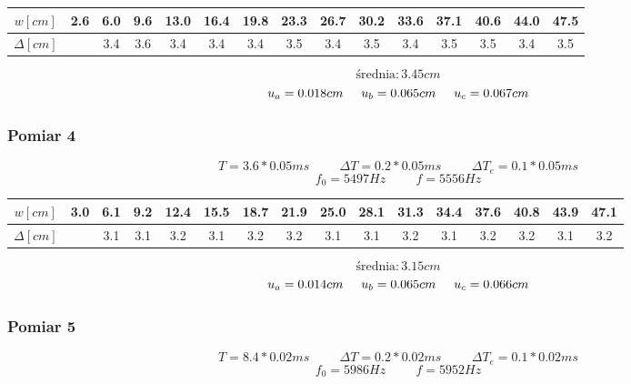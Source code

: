 \documentclass[12pt,a4paper]{article}
\begin{document}
\begin{adjustbox}{max width=1.2\textwidth}
\begin{tabular}{|c|cccccccccccccc|}
\hline 
$w[cm]$ & 2.6 & 6.0 & 9.6 &13.0& 16.4& 19.8 &23.3& 26.7 &30.2& 33.6 &37.1 &40.6& 44.0& 47.5 \\ 
\hline 
$\Delta[cm]$ & & 3.4 &3.6& 3.4& 3.4 &3.4 &3.5& 3.4 &3.5& 3.4& 3.5& 3.5& 3.4& 3.5 \\ 
\hline 
\end{tabular} 
\end{adjustbox}


$$\text{średnia}: 3.45cm$$
$$u_a = 0.018cm \hspace{0.5cm} u_b = 0.065cm \hspace{0.5cm} u_c = 0.067cm $$

\subsubsection{Pomiar 4}
$$
T = 3.6*0.05ms \hspace{1cm} \Delta T = 0.2*0.05ms \hspace{1cm} \Delta T_e = 0.1*0.05ms 
$$
$$
f_0 = 5497 Hz \hspace{1cm} f=5556Hz
$$

\begin{adjustbox}{max width=1.2\textwidth}
\begin{tabular}{|c|ccccccccccccccc|}
\hline 
$w[cm]$ & 3.0 & 6.1 & 9.2& 12.4& 15.5& 18.7 &21.9& 25.0& 28.1 &31.3& 34.4& 37.6& 40.8& 43.9& 47.1 \\ 
\hline 
$\Delta[cm]$ & & 3.1& 3.1& 3.2& 3.1& 3.2 &3.2 &3.1& 3.1& 3.2 &3.1& 3.2& 3.2& 3.1& 3.2 \\ 
\hline 
\end{tabular} 
\end{adjustbox}

$$\text{średnia}: 3.15cm$$
$$u_a = 0.014cm \hspace{0.5cm} u_b = 0.065cm \hspace{0.5cm} u_c = 0.066cm $$

\subsubsection{Pomiar 5}
$$
T = 8.4*0.02ms \hspace{1cm} \Delta T = 0.2*0.02ms \hspace{1cm} \Delta T_e = 0.1*0.02ms 
$$
$$
f_0 = 5986 Hz \hspace{1cm} f=5952Hz
$$
\end{document}
